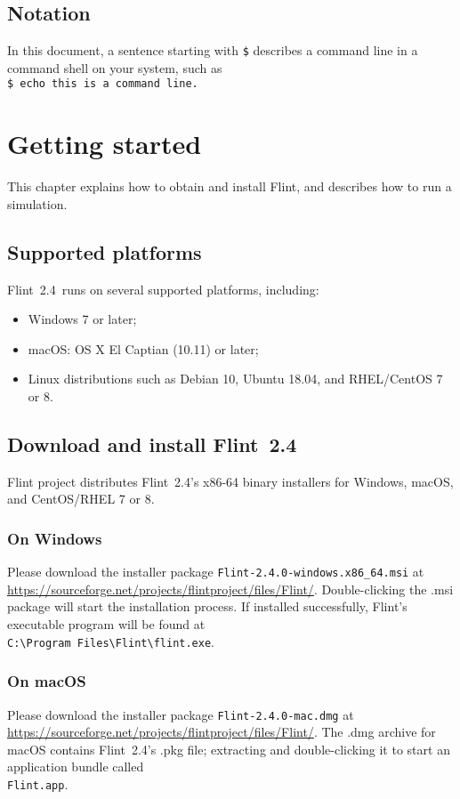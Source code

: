 \documentclass[a4paper,10pt]{report}
\def\FlintVersion{2.4}
\def\FlintLongVersion{2.4.0}
\def\Flint{Flint~\FlintVersion}
\def\FlintFilenamePrefix{Flint-\FlintLongVersion}
\newcommand{\filename}[1]{{\tt #1}}
\begin{document}
\section{Notation}
In this document, a sentence starting with {\tt \$} describes a command line in
a command shell on your system, such as\\
{\tt \$ echo this is a command line.}



\chapter{Getting started}

This chapter explains how to obtain and install Flint, and describes how to run
a simulation.

\section{Supported platforms}
\Flint\ runs on several supported platforms, including:
\begin{itemize}
\item Windows 7 or later;
\item macOS: OS X El Captian (10.11) or later;
\item Linux distributions such as Debian 10, Ubuntu 18.04, and RHEL/CentOS 7 or 8.
\end{itemize}

\section{Download and install \Flint}
Flint project distributes \Flint's x86-64 binary installers for Windows,
macOS, and CentOS/RHEL 7 or 8.

\subsection{On Windows}
Please download the installer package
\filename{\FlintFilenamePrefix-windows.x86\_64.msi} at
\url{https://sourceforge.net/projects/flintproject/files/Flint/}.
Double-clicking the .msi package will start the installation process.
If installed successfully, Flint's executable program will be found at\\
\filename{C:\textbackslash Program Files\textbackslash Flint\textbackslash flint.exe}.

\subsection{On macOS}
Please download the installer package \filename{\FlintFilenamePrefix-mac.dmg} at
\url{https://sourceforge.net/projects/flintproject/files/Flint/}.
The .dmg archive for macOS contains \Flint's .pkg file; extracting and
double-clicking it to start an application bundle called\\
\filename{Flint.app}.
\end{document}
